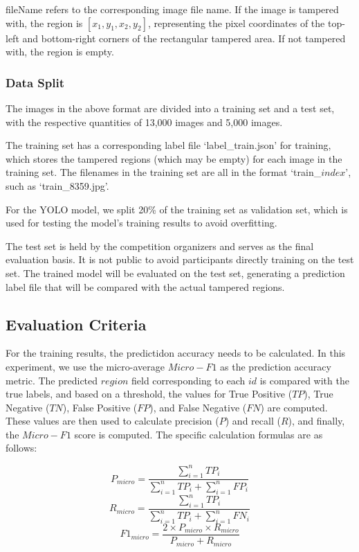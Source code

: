 fileName refers to the corresponding image file name. If the image is tampered with, the region is $[x_1, y_1, x_2, y_2]$, representing the pixel coordinates of the top-left and bottom-right corners of the rectangular tampered area. If not tampered with, the region is empty.

\subsubsection{Data Split}

The images in the above format are divided into a training set and a test set, with the respective quantities of 13,000 images and 5,000 images.

The training set has a corresponding label file `label\_train.json' for training, which stores the tampered regions (which may be empty) for each image in the training set. The filenames in the training set are all in the format `train\_$index$', such as `train\_8359.jpg'.

For the YOLO model, we split 20\% of the training set as validation set, which is used for testing the model's training results to avoid overfitting.

The test set is held by the competition organizers and serves as the final evaluation basis. It is not public to avoid participants directly training on the test set. The trained model will be evaluated on the test set, generating a prediction label file that will be compared with the actual tampered regions.

\subsection{Evaluation Criteria}

For the training results, the predictidon accuracy needs to be calculated. In this experiment, we use the micro-average $Micro-F1$ as the prediction accuracy metric. The predicted $region$ field corresponding to each $id$ is compared with the true labels, and based on a threshold, the values for True Positive ($TP$), True Negative ($TN$), False Positive ($FP$), and False Negative ($FN$) are computed. These values are then used to calculate precision ($P$) and recall ($R$), and finally, the $Micro-F1$ score is computed. The specific calculation formulas are as follows:

\begin{equation}
  P_{micro} = \frac{\sum_{i=1}^nTP_i}{\sum_{i=1}^nTP_i + \sum_{i=1}^nFP_i}
  \label{eq:p-micro}
\end{equation}
\begin{equation}
  R_{micro} = \frac{\sum_{i=1}^nTP_i}{\sum_{i=1}^nTP_i + \sum_{i=1}^nFN_i}
  \label{eq:r-micro}
\end{equation}
\begin{equation}
  F1_{micro} = \frac{2 \times P_{micro} \times R_{micro}}{P_{micro} + R_{micro}}
  \label{eq:f1-micro}
\end{equation}
